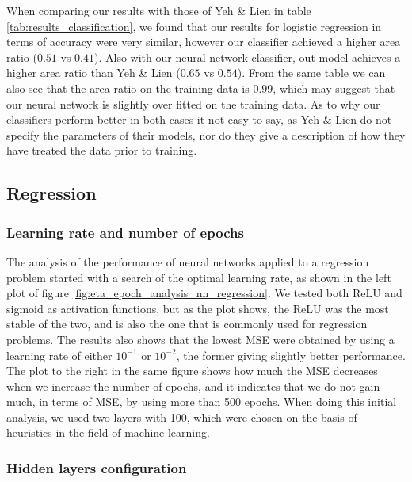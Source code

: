 When comparing our results with those of Yeh \& Lien in table \ref{tab:results_classification}, we found that our results for logistic regression in terms of accuracy were very similar, however our classifier achieved a higher area ratio ($0.51$ vs $0.41$). Also with our neural network classifier, out model achieves a higher area ratio than Yeh \& Lien ($0.65$ vs $0.54$). From the same table we can also see that the area ratio on the training data is $0.99$, which may suggest that our neural network is slightly over fitted on the training data. As to why our classifiers perform better in both cases it not easy to say, as Yeh \& Lien do not specify the parameters of their models, nor do they give a description of how they have treated the data prior to training. 





\subsection{Regression}


\subsubsection{Learning rate and number of epochs}

The analysis of the performance of neural networks applied to a regression problem started with a search of the optimal learning rate, as shown in the left plot of figure \ref{fig:eta_epoch_analysis_nn_regression}. We tested both ReLU and sigmoid as activation functions, but as the plot shows, the ReLU was the most stable of the two, and is also the one that is commonly used for regression problems. The results also shows that the lowest MSE were obtained by using a learning rate of either $10^{-1}$ or $10^{-2}$, the former giving slightly better performance. The plot to the right in the same figure shows how much the MSE decreases when we increase the number of epochs, and it indicates that we do not gain much, in terms of MSE, by using more than 500 epochs. When doing this initial analysis, we used two layers with 100, which were chosen on the basis of heuristics in the field of machine learning\cite{geron}.

\subsubsection{Hidden layers configuration}

